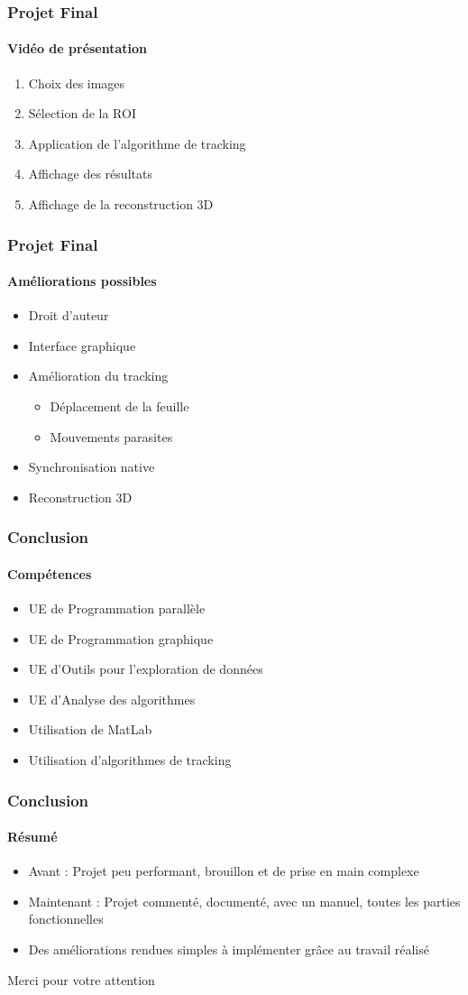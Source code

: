 \documentclass[12pt]{beamer}
\begin{document}
\begin{frame}
\frametitle{Projet Final}
\framesubtitle{Vidéo de présentation}
\begin{enumerate}
\item Choix des images
\item Sélection de la ROI
\item Application de l'algorithme de tracking
\item Affichage des résultats
\item Affichage de la reconstruction 3D
\end{enumerate}
\end{frame}

\begin{frame}
\frametitle{Projet Final}
\framesubtitle{Améliorations possibles}
\begin{itemize}
\item Droit d'auteur
\item Interface graphique
\item Amélioration du tracking
\begin{itemize}
\item Déplacement de la feuille
\item Mouvements parasites
\end{itemize}
\item Synchronisation native
\item Reconstruction 3D
\end{itemize}
\end{frame}

\begin{frame}
\frametitle{Conclusion}
\framesubtitle{Compétences}
\begin{itemize}
\item UE de Programmation parallèle
\item UE de Programmation graphique
\item UE d'Outils pour l'exploration de données
\item UE d'Analyse des algorithmes
\item Utilisation de MatLab
\item Utilisation d'algorithmes de tracking
\end{itemize}
\end{frame}

\begin{frame}
\frametitle{Conclusion}
\framesubtitle{Résumé}
\begin{itemize}
\item Avant : Projet peu performant, brouillon et de prise en main complexe
\item Maintenant : Projet commenté, documenté, avec un manuel, toutes les parties fonctionnelles
\item Des améliorations rendues simples à implémenter grâce au travail réalisé
\end{itemize}
\end{frame}

\begin{frame}
\Huge{\centerline{Merci pour votre attention}}
\end{frame}
\end{document}
